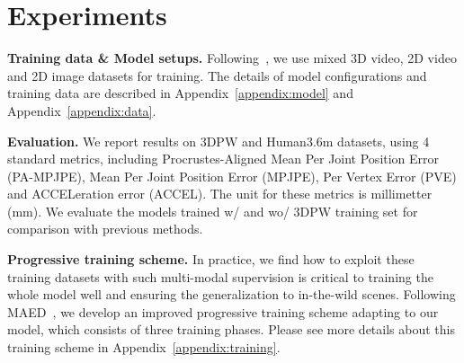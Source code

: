 \section{Experiments}

\label{details}
{\bf Training data \& Model setups.} Following~\citep{hmr:kanazawa2018end, vibe:kocabas2020vibe, maed:wan2021encoder}, we use mixed 3D video, 2D video and 2D image datasets for training. The details of model configurations and training data are described in Appendix~\ref{appendix:model} and Appendix~\ref{appendix:data}. 

{\bf Evaluation.} We report results on 3DPW and Human3.6m datasets,  using 4 standard metrics, including Procrustes-Aligned Mean Per Joint Position Error (PA-MPJPE), Mean Per Joint Position Error (MPJPE), Per Vertex Error (PVE) and ACCELeration error (ACCEL). The unit for these metrics is millimetter (mm). We evaluate the models trained w/ and wo/ 3DPW training set for comparison with previous methods.







{\bf Progressive training scheme.}  In practice, we find how to exploit these training datasets with such multi-modal supervision is critical to training the whole model well and ensuring the generalization to in-the-wild scenes. Following MAED~\citep{maed:wan2021encoder},  we develop an improved progressive training scheme adapting to our model, which consists of three training phases. Please see more details about this training scheme in Appendix~\ref{appendix:training}.



